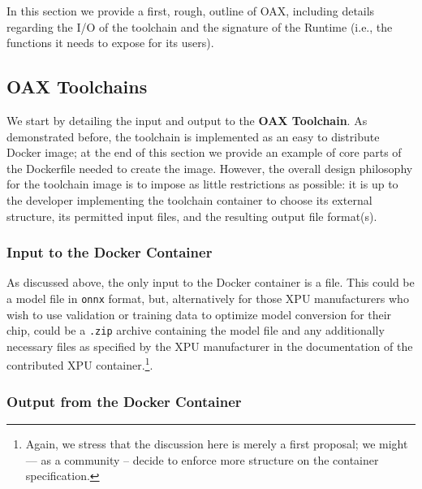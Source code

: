 \documentclass{article}
\begin{document}
In this section we provide a first, rough, outline of OAX, including details regarding the I/O of the toolchain and the signature of the Runtime (i.e., the functions it needs to expose for its users).

\subsection{OAX Toolchains}

We start by detailing the input and output to the \textbf{OAX Toolchain}. As demonstrated before, the toolchain is implemented as an easy to distribute Docker image; at the end of this section we provide an example of core parts of the Dockerfile needed to create the image. However, the overall design philosophy for the toolchain image is to impose as little restrictions as possible: it is up to the developer implementing the toolchain container to choose its external structure, its permitted input files, and the resulting output file format(s).

\subsubsection{Input to the Docker Container}

As discussed above, the only input to the Docker container is a file. This could be a model file in \texttt{onnx} format, but, alternatively for those XPU manufacturers who wish to use validation or training data to optimize model conversion for their chip, could be a \texttt{.zip} archive containing the model file and any additionally necessary files as specified by the XPU manufacturer in the documentation of the contributed XPU container.\footnote{Again, we stress that the discussion here is merely a first proposal; we might --- as a community -- decide to enforce more structure on the container specification.}.

\subsubsection{Output from the Docker Container}
\end{document}
